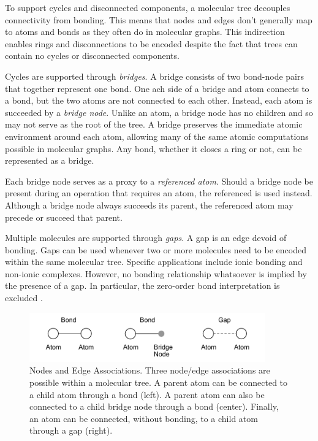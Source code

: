 \documentclass{article}
\begin{document}
To support cycles and disconnected components, a molecular tree decouples connectivity from bonding. This means that nodes and edges don't generally map to atoms and bonds as they often do in molecular graphs. This indirection enables rings and disconnections to be encoded despite the fact that trees can contain no cycles or disconnected components.

Cycles are supported through \textit{bridges}. A bridge consists of two bond-node pairs that together represent one bond. One ach side of a bridge and atom connects to a bond, but the two atoms are not connected to each other. Instead, each atom is succeeded by a \textit{bridge node}. Unlike an atom, a bridge node has no children and so may not serve as the root of the tree. A bridge preserves the immediate atomic environment around each atom, allowing many of the same atomic computations possible in molecular graphs. Any bond, whether it closes a ring or not, can be represented as a bridge.

Each bridge node serves as a proxy to a \textit{referenced atom}. Should a bridge node be present during an operation that requires an atom, the referenced is used instead. Although a bridge node always succeeds its parent, the referenced atom may precede or succeed that parent.

Multiple molecules are supported through \textit{gaps}. A gap is an edge devoid of bonding. Gaps can be used whenever two or more molecules need to be encoded within the same molecular tree. Specific applications include ionic bonding and non-ionic complexes. However, no bonding relationship whatsoever is implied by the presence of a gap. In particular, the zero-order bond interpretation is excluded \cite{clark:2011}.

\begin{figure}
    \centering
    \includegraphics[width=4in]{node-and-edge-associations.pdf}
    \caption{Nodes and Edge Associations. Three node/edge associations are possible within a molecular tree. A parent atom can be connected to a child atom through a bond (left). A parent atom can also be connected to a child bridge node through a bond (center). Finally, an atom can be connected, without bonding, to a child atom through a gap (right).}
    \label{fig:nodes-and-edge-associations}
\end{figure}
\end{document}
